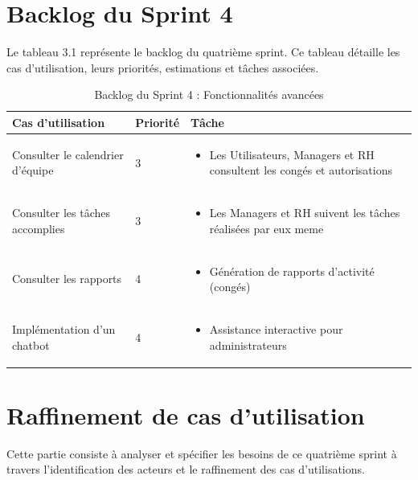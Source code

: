 \section{Backlog du Sprint 4}
Le tableau 3.1 représente le backlog du quatrième sprint. Ce tableau détaille les cas d’utilisation, leurs priorités, estimations et tâches associées.
\begin{table}[!ht]
    \begin{adjustwidth}{-3.5cm}{-3.5cm}
        \vspace{-0.2cm}
    \centering
    \caption{Backlog du Sprint 4 : Fonctionnalités avancées}
    \label{tab:backlog_sprint4}
    \begin{tabular}{ | m{5cm} | m{1cm} | m{11.5cm} | }
    \hline
    \cellcolor[rgb]{0.832,0.832,0.832}Cas d'utilisation & \cellcolor[rgb]{0.832,0.832,0.832}Priorité & \cellcolor[rgb]{0.832,0.832,0.832}Tâche \\
    \hline
    Consulter le calendrier d'équipe & 3 & 
    \begin{itemize}
        \item Les Utilisateurs, Managers et RH consultent les congés et autorisations
    \end{itemize} \\
    \hline
    Consulter les tâches accomplies & 3 & 
    \begin{itemize}
            \item Les Managers et RH suivent les tâches réalisées par eux meme
    \end{itemize} \\
    \hline
    Consulter les rapports & 4 & 
    \begin{itemize}
        \item Génération de rapports d'activité (congés)
    \end{itemize} \\
    \hline
    Implémentation d'un chatbot & 4 & 
    \begin{itemize}
        \item Assistance interactive pour administrateurs
    \end{itemize} \\
    \hline
    \end{tabular}
    \end{adjustwidth}
\end{table}
\newpage    
\section{Raffinement de cas d'utilisation} Cette partie consiste à analyser et spécifier les besoins de ce quatrième sprint à travers l’identification des acteurs et le raffinement des cas d’utilisations.

